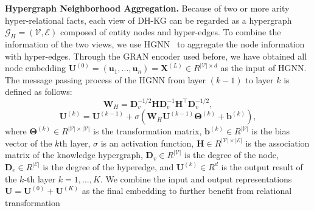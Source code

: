 \documentclass[letterpaper]{article} \usepackage{aaai23}  \usepackage{times}  \usepackage{helvet}  \usepackage{courier}  \usepackage[hyphens]{url}  \usepackage{graphicx} \urlstyle{rm} \def\UrlFont{\rm}  \usepackage{natbib}  \usepackage{caption} \frenchspacing  \setlength{\pdfpagewidth}{8.5in}  \setlength{\pdfpageheight}{11in}  \usepackage{times}
\begin{document}
\textbf{Hypergraph Neighborhood Aggregation.} Because of two or more arity hyper-relational facts, each view of DH-KG can be regarded as a hypergraph $\mathcal{G}_H=(\mathcal{V}, \mathcal{E})$ composed of entity nodes and hyper-edges. To combine the information of the two views, we use HGNN~\citep{HGNN} to aggregate the node information with hyper-edges. Through the GRAN encoder used before, we have obtained all node embedding  $\mathbf{U}^{(0)}=(\mathbf{u}_1,...,\mathbf{u}_n)=\mathbf{X}^{(L)} \in R^{|\mathcal{V}|\times d}$ as the input of HGNN. The message passing process of the HGNN from layer $(k-1)$ to layer $k$ is defined as follows:
\begin{equation}
\mathbf{W}_H=\mathbf{D}_{v}^{-1 / 2} \mathbf{H} \mathbf{D}_{e}^{-1} \mathbf{H}^{\top} \mathbf{D}_{v}^{-1/2},
\end{equation}
\begin{equation}
\mathbf{U}^{(k)}=\mathbf{U}^{(k-1)}+\sigma\left(\mathbf{W}_H\mathbf{U}^{(k-1)}\boldsymbol{\Theta}^{(k)}+\mathbf{b}^{(k)}\right),
\end{equation}
where $\mathbf{\Theta}^{(k)}\in R^{|\mathcal{V}|\times|\mathcal{V}|}$ is the transformation matrix, $\mathbf{b}^{(k)}\in R^{|\mathcal{V}|}$ is the bias vector of the $k$th layer, $\sigma$ is an activation function, $\mathbf{H}\in R^{|\mathcal{V}|\times|\mathcal{E}|}$ is the association matrix of the knowledge hypergraph,  $\mathbf{D}_v\in R^{|\mathcal{V}|}$ is the degree of the node, $\mathbf{D}_e\in R^{|\mathcal{E}|}$ is the degree of the hyperedge, and $\mathbf{U}^{(k)}\in R^{d}$ is the output result of the $k$-th layer $k=1,...,K$. We combine the input and output representations $\mathbf{U}=\mathbf{U}^{(0)}+\mathbf{U}^{(K)}$ as the final embedding to further benefit from relational transformation
\end{document}
